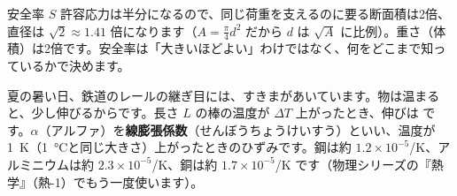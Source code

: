 \begin{phbaisuru}{安全率 $S$}
許容応力は半分になるので、同じ荷重を支えるのに要る断面積は2倍、直径は $\sqrt{2}\approx1.41$ 倍になります（$A=\tfrac{\pi}{4}d^2$ だから $d$ は $\sqrt{A}$ に比例）。重さ（体積）は2倍です。安全率は「大きいほどよい」わけではなく、何をどこまで知っているかで決めます。
\end{phbaisuru}

\leavevmode\label{ph:力-8:sec7}夏の暑い日、鉄道のレールの継ぎ目には、すきまがあいています。物は温まると、少し伸びるからです。長さ $L$ の棒の温度が $\Delta T$ 上がったとき、伸びは
です。$\alpha$（アルファ）を\textbf{線膨張係数}（せんぼうちょうけいすう）といい、温度が\qty{1}{K}（\qty{1}{\celsius}と同じ大きさ）上がったときのひずみです。鋼は約 $1.2\times10^{-5}$/K、アルミニウムは約 $2.3\times10^{-5}$/K、銅は約 $1.7\times10^{-5}$/K です（物理シリーズの『熱学』（熱-1）でもう一度使います）。

